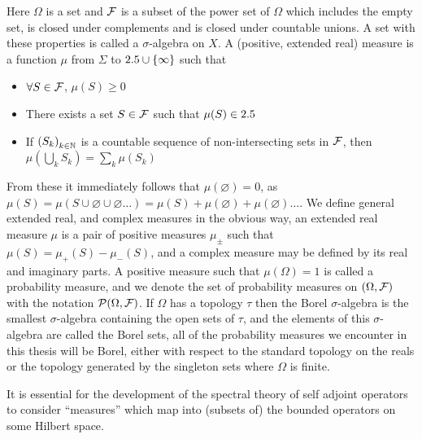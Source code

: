 Here $\Omega$ is a set and $\mathcal{F}$ is a subset of the power set of $\Omega$ which includes the empty set, is closed under complements and is closed under countable unions. A set with these properties is called a $\sigma$-algebra on $X$. A (positive, extended real) measure is a function $\mu$ from $\Sigma$ to $2.5\cup \{\infty\}$ such that
\begin{itemize}
  \item $\forall S\in\mathcal{F} $, $\mu(S)\geq 0$
  \item There exists a set $S\in\mathcal{F}$ such that $\mu(S) \in2.5$
  \item If $\seq{S_k}[k\in\N]$ is a countable sequence of non-intersecting sets in $\mathcal{F}$, then $\mu(\bigcup_k S_k) = \sum_k\mu(S_k)$
\end{itemize}
From these it immediately follows that $\mu(\varnothing) = 0$, as $\mu(S) = \mu(S \cup \varnothing\cup\varnothing\ldots) = \mu(S) + \mu(\varnothing) + \mu(\varnothing)\ldots$. We define general extended real, and complex measures in the obvious way, an extended real measure $\mu$ is a pair of positive measures $\mu_\pm$ such that $\mu(S) = \mu_+(S) - \mu_-(S)$, and a complex measure may be defined by its real and imaginary parts. A positive measure such that $\mu(\Omega) = 1$ is called a probability measure, and we denote the set of probability measures on $(\Omega,\mathcal{F})$ with the notation $\mathcal{P}\!\left({\Omega}, {\mathcal{F}}\right)$. If $\Omega$ has a topology $\tau$ then the Borel $\sigma$-algebra is the smallest $\sigma$-algebra containing the open sets of $\tau$, and the elements of this $\sigma$-algebra are called the Borel sets, all of the probability measures we encounter in this thesis will be Borel, either with respect to the standard topology on the reals or the topology generated by the singleton sets where $\Omega$ is finite.

It is essential for the development of the spectral theory of self adjoint operators to consider ``measures'' which map into (subsets of) the bounded operators on some Hilbert space.

